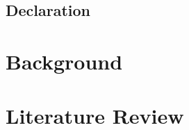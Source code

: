 \documentclass[12pt]{report}
\begin{document}
    \section*{Declaration}
    
    
    \chapter{Background}
    
    
    \chapter{Literature Review}
    
    
    \printbibliography
\end{document}
